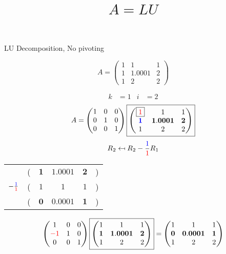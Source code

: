 \documentclass[pdf]{beamer}
\title{$A=LU$}
\subtitle{}
\author{}
\begin{document}
\begin{frame}{}
\begin{center}LU Decomposition, No pivoting\end{center} $$A = \begin{pmatrix}1&1&1\\1&1.0001&2\\1&2&2\end{pmatrix}$$\end{frame}
\begin{frame}{}\begin{align*} k &= 1 & i &= 2 \end{align*} $$A=\begin{pmatrix}1&0&0\\0&1&0\\0&0&1\end{pmatrix} \boxed{\begin{pmatrix}\boxed{{\color{red}1}}&1&1\\\mathbf{{\color{blue}1}}&\mathbf{1.0001}&\mathbf{2}\\1&2&2\end{pmatrix}} $$ $$R_2 \mapsfrom R_2 - \frac{{\color{blue}1}}{{\color{red}1}} R_1$$ \begin{center}\begin{tabular}{cccccc}  &(& $ \mathbf{1} $ & $ \mathbf{1.0001} $ & $ \mathbf{2} $ &)\\$ -\frac{{\color{blue}1}}{{\color{red}1}} $&(& $ 1 $ & $ 1 $ & $ 1 $ &)\\\hline  &(& $ \mathbf{0} $ & $ \mathbf{0.0001} $ & $ \mathbf{1} $ &) \end{tabular}\end{center} $$ \begin{pmatrix}1&0&0\\{\color{red}-1}&1&0\\0&0&1\end{pmatrix} \boxed{\begin{pmatrix}1&1&1\\\mathbf{1}&\mathbf{1.0001}&\mathbf{2}\\1&2&2\end{pmatrix}} = \begin{pmatrix}1&1&1\\\mathbf{0}&\mathbf{0.0001}&\mathbf{1}\\1&2&2\end{pmatrix} $$\end{frame}
\end{document}
